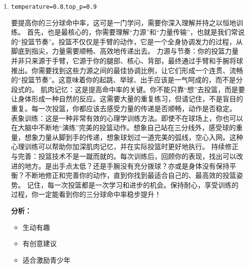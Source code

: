 \documentclass{article}
\theoremstyle{plain}
\theoremstyle{definition}
\theoremstyle{remark}
\begin{document}
\begin{enumerate}
  \item
  \lstinline{temperature=0.8},\lstinline{top_p=0.9}
  \begin{techbox}
      要提高你的三分球命中率，这可是一门学问，需要你深入理解并持之以恒地训练。
  首先，也是最核心的，你需要理解“力源”和“力量传输”，也就是我们常说的“投篮节奏”。投篮不仅仅是手臂的动作，它是一个全身协调发力的过程，从脚底到指尖，力量需要顺畅、高效地传递出去。
  力源与节奏：你的投篮力量并非只来源于手臂，它源于你的腿部、核心、背部，最终通过手臂和手腕将球推出。你需要找到这些力源之间的最佳协调比例，让它们形成一个连贯、流畅的“投篮节奏”。这意味着你的起跳、举球、出手应该是一气呵成的，而不是分段式的。
  肌肉记忆：这是提高命中率的关键。你不能只靠“想”去投篮，而是要让身体形成一种自然的反应。这需要大量的重复练习，但请记住，不是盲目的重复。每一次投篮，你都应该去感受力量的传递是否顺畅，动作是否稳定。
  表象训练：这是一种非常有效的心理学训练方法。即使不在球场上，你也可以在大脑中不断地“演练”完美的投篮动作。想象自己站在三分线外，感受球的重量，想象力量从脚到手的传递，想象球划过一道完美的弧线，空心入网。这种心理训练可以帮助你加深肌肉记忆，并在实际投篮时更好地执行。
  持续修正与完善：投篮技术不是一蹴而就的。每次训练后，回顾你的表现，找出可以改进的地方。是出手点太低？还是手腕没有充分拨球？亦或是身体没有保持平衡？不断地修正和完善你的动作，直到你找到最适合自己的、最高效的投篮姿势。
  记住，每一次投篮都是一次学习和进步的机会。保持耐心，享受训练的过程，你一定能看到你的三分球命中率稳步提升！
  \end{techbox}
  \textbf{分析：}
  \begin{itemize}
    \item 生动有趣
    \item 有创意建议
    \item 适合激励青少年
  \end{itemize}
\end{enumerate}
\end{document}
